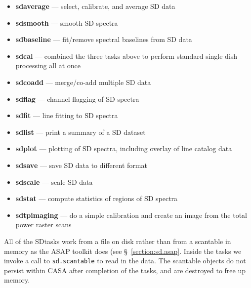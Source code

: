\begin{itemize}

\item {\bf sdaverage} --- select, calibrate, and average SD data

\item {\bf sdsmooth} --- smooth SD spectra

\item {\bf sdbaseline} --- fit/remove spectral baselines from SD data

\item {\bf sdcal} --- combined the three tasks above to perform standard single dish processing all at once 

\item {\bf sdcoadd} --- merge/co-add multiple SD data

\item {\bf sdflag} --- channel flagging of SD spectra

\item {\bf sdfit} --- line fitting to SD spectra

\item {\bf sdlist} --- print a summary of a SD dataset

\item {\bf sdplot} --- plotting of SD spectra, including overlay of line
catalog data

\item {\bf sdsave} --- save SD data to different format

\item {\bf sdscale} --- scale SD data
 
\item {\bf sdstat} --- compute statistics of regions of SD spectra

\item {\bf sdtpimaging} --- do a simple calibration and create an image from the total power raster scans
 

\end{itemize}

All of the SDtasks work from a file on disk rather than from
a scantable in memory as the ASAP toolkit does (see 
\S~\ref{section:sd.asap}.  Inside the tasks we invoke a call
to {\tt sd.scantable} to read in the data.  The scantable objects
do not persist within CASA after completion of the tasks, and
are destroyed to free up memory.

